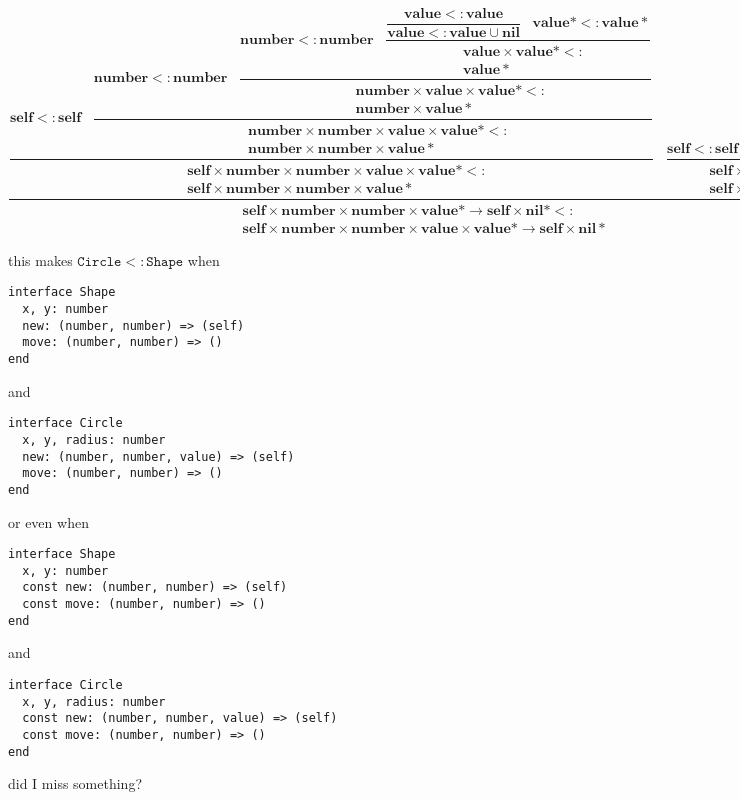 \documentclass[12pt]{article}
\newcommand{\Top}{\mathbf{value}}
\newcommand{\Nil}{\mathbf{nil}}
\newcommand{\Self}{\mathbf{self}}
\newcommand{\Number}{\mathbf{number}}
\newcommand{\TopStar}{\Top{*}}
\newcommand{\NilStar}{\Nil{*}}
\newcommand{\subtype}{<:}
\begin{document}
\begin{scriptsize}
\[
\dfrac
{
\dfrac
{
\Self \subtype \Self \;\;\;
\dfrac
{
\Number \subtype \Number \;\;\;
\dfrac
{
\Number \subtype \Number \;\;\;
\dfrac
{
\dfrac
{
\Top \subtype \Top
}
{\Top \subtype \Top \cup \Nil} \;\;\;
\TopStar \subtype \TopStar
}
{
\begin{aligned}
& \Top \times \TopStar \subtype \\
& \TopStar
\end{aligned}
}
}
{
\begin{aligned}
& \Number \times \Top \times \TopStar \subtype \\
& \Number \times \TopStar
\end{aligned}
}
}
{
{
\begin{aligned}
& \Number \times \Number \times \Top \times \TopStar \subtype \\
& \Number \times \Number \times \TopStar
\end{aligned}
}
}
}
{
\begin{aligned}
& \Self \times \Number \times \Number \times \Top \times \TopStar \subtype \\
& \Self \times \Number \times \Number \times \TopStar
\end{aligned}
}
\;\;\;
\dfrac
{
\Self \subtype \Self \;\;\;
\NilStar \subtype \NilStar
}
{
\begin{aligned}
& \Self \times \NilStar \subtype \\
& \Self \times \NilStar
\end{aligned}
}
}
{
\begin{aligned}
& \Self \times \Number \times \Number \times \TopStar \rightarrow \Self \times \NilStar \subtype \\
& \Self \times \Number \times \Number \times \Top \times \TopStar \rightarrow \Self \times \NilStar
\end{aligned}
}
\]
\end{scriptsize}

this makes $\texttt{Circle} \subtype \texttt{Shape}$ when

\begin{verbatim}
interface Shape
  x, y: number
  new: (number, number) => (self)
  move: (number, number) => ()
end
\end{verbatim}

and

\begin{verbatim}
interface Circle
  x, y, radius: number
  new: (number, number, value) => (self)
  move: (number, number) => ()
end
\end{verbatim}

or even when

\begin{verbatim}
interface Shape
  x, y: number
  const new: (number, number) => (self)
  const move: (number, number) => ()
end
\end{verbatim}

and

\begin{verbatim}
interface Circle
  x, y, radius: number
  const new: (number, number, value) => (self)
  const move: (number, number) => ()
end
\end{verbatim}

did I miss something?
\end{document}
